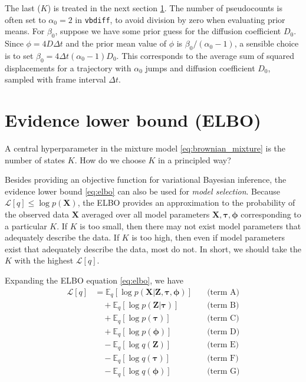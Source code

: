 \documentclass{article}
\let\vec\boldsymbol
\begin{document}
The last ($K$) is treated in the next section \ref{section:elbo}. The number of pseudocounts is often set to $\alpha_{0} = 2$ in \verb|vbdiff|, to avoid division by zero when evaluating prior means. For $\beta_{0}$, suppose we have some prior guess for the diffusion coefficient $D_{0}$. Since $\phi = 4 D \Delta t$ and the prior mean value of $\phi$ is $\beta_{0} / (\alpha_{0} - 1)$, a sensible choice is to set $\beta_{0} = 4 \Delta t (\alpha_{0} - 1) D_{0}$. This corresponds to the average sum of squared displacements for a trajectory with $\alpha_{0}$ jumps and diffusion coefficient $D_{0}$, sampled with frame interval $\Delta t$.

\section{Evidence lower bound (ELBO)}\label{section:elbo}

A central hyperparameter in the mixture model \ref{eq:brownian_mixture} is the number of states $K$. How do we choose $K$ in a principled way? \newline

Besides providing an objective function for variational Bayesian inference,
the evidence lower bound \ref{eq:elbo} can also be used for \emph{model selection}. Because $\mathcal{L}[q] \leq \log p \left( \vec{X} \right)$, the ELBO provides an approximation to the probability of the observed data $\vec{X}$ averaged over all model parameters $\vec{X}, \boldsymbol{\tau}, \boldsymbol{\phi}$ corresponding to a particular $K$. If $K$ is too small, then there may not exist model parameters that adequately describe the data. If $K$ is too high, then even if model parameters exist that adequately describe the data, most do not. In short, we should take the $K$ with the highest $\mathcal{L}[q]$. \newline

Expanding the ELBO equation \ref{eq:elbo}, we have
\begin{align}
    \mathcal{L} [q] &= \mathbb{E}_{q} \left[ \log p \left( \vec{X} | \vec{Z}, \boldsymbol{\tau}, \boldsymbol{\phi} \right) \right] \quad &\text{(term A)} \\
    &\quad + \mathbb{E}_{q} \left[ \log p \left( \vec{Z} | \boldsymbol{\tau} \right) \right] \quad &\text{(term B)} \\
    &\quad + \mathbb{E}_{q} \left[ \log p \left( \boldsymbol{\tau} \right) \right] \quad &\text{(term C)} \\
    &\quad + \mathbb{E}_{q} \left[ \log p \left( \boldsymbol{\phi} \right) \right] \quad &\text{(term D)} \\
    &\quad - \mathbb{E}_{q} \left[ \log q \left( \vec{Z} \right) \right] \quad &\text{(term E)} \\
    &\quad - \mathbb{E}_{q} \left[ \log q \left( \boldsymbol{\tau} \right) \right] \quad &\text{(term F)} \\
    &\quad - \mathbb{E}_{q} \left[ \log q \left( \boldsymbol{\phi} \right) \right] \quad &\text{(term G)}
\end{align}
\end{document}
